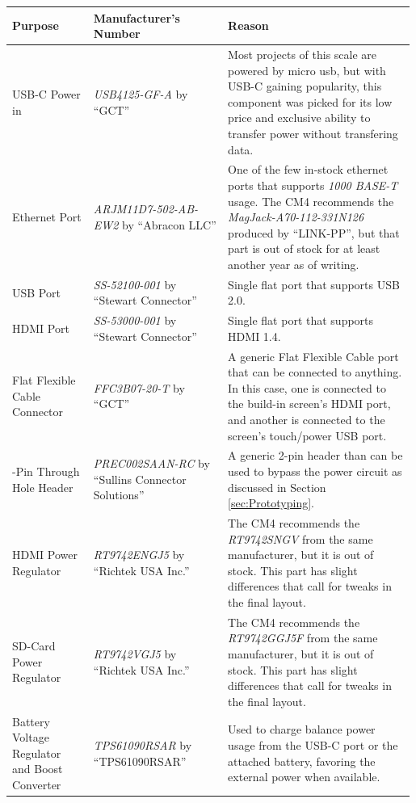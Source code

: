 \renewcommand*{\arraystretch}{1.5} %
\begin{longtable}{|>{\raggedright\arraybackslash}p{0.2\linewidth}|>{\raggedright\arraybackslash}p{0.33\linewidth}|>{\raggedright\arraybackslash}p{0.46\linewidth}|}
  \hline
  \bfseries Purpose & \bfseries Manufacturer's Number &\bfseries Reason \\%
  \hline
  USB-C Power in & \emph{USB4125-GF-A} by \enquote{GCT} & Most projects of this scale are powered by micro usb, but with USB-C gaining popularity, this component was picked for its low price and exclusive ability to transfer power without transfering data. \\
  \hline
  Ethernet Port & \emph{ARJM11D7-502-AB-EW2} by \enquote{Abracon LLC} & One of the few in-stock ethernet ports that supports \emph{1000 BASE-T} usage. The CM4 recommends the \emph{MagJack-A70-112-331N126} produced by \enquote{LINK-PP}, but that part is out of stock for at least another year as of writing. \\
  \hline
  USB Port & \emph{SS-52100-001} by \enquote{Stewart Connector} & Single flat port that supports USB 2.0. \\
  \hline
  HDMI Port & \emph{SS-53000-001} by \enquote{Stewart Connector} & Single flat port that supports HDMI 1.4. \\
  \hline
  Flat Flexible Cable Connector & \emph{FFC3B07-20-T} by \enquote{GCT} & A generic Flat Flexible Cable port that can be connected to anything. In this case, one is connected to the build-in screen's HDMI port, and another is connected to the screen's touch/power USB port. \\
  \hline
  2-Pin Through Hole Header & \emph{PREC002SAAN-RC} by \enquote{Sullins Connector Solutions} & A generic 2-pin header than can be used to bypass the power circuit as discussed in Section \ref{sec:Prototyping}. \\
  \hline
  HDMI Power Regulator & \emph{RT9742ENGJ5} by \enquote{Richtek USA Inc.} & The CM4 recommends the \emph{RT9742SNGV} from the same manufacturer, but it is out of stock. This part has slight differences that call for tweaks in the final layout. \\
  \hline
  SD-Card Power Regulator & \emph{RT9742VGJ5} by \enquote{Richtek USA Inc.} & The CM4 recommends the \emph{RT9742GGJ5F} from the same manufacturer, but it is out of stock. This part has slight differences that call for tweaks in the final layout. \\
  \hline
  Battery Voltage Regulator and Boost Converter & \emph{TPS61090RSAR} by \enquote{TPS61090RSAR} & Used to charge balance power usage from the USB-C port or the attached battery, favoring the external power when available. \\

\end{longtable}
